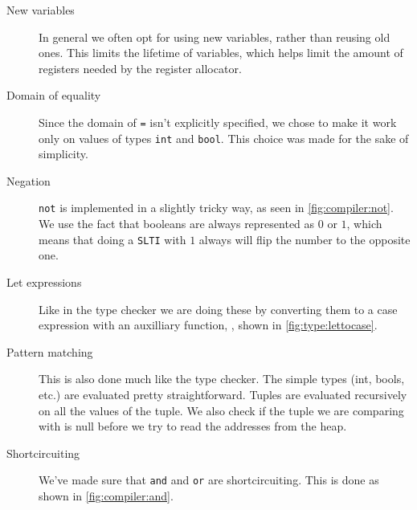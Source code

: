 \begin{description}
\item [New variables] In general we often opt for using new variables, rather
        than reusing old ones. This limits the lifetime of variables, which
        helps limit the amount of registers needed by the register allocator.

\item [Domain of equality] Since the domain of \texttt{=} isn't explicitly
        specified, we chose to make it work only on values of types
        \texttt{int} and \texttt{bool}. This choice was made for the sake of
        simplicity.

\item [Negation] \texttt{not} is implemented in a slightly tricky way, as seen
        in \autoref{fig:compiler:not}. We use the fact that booleans are always
        represented as $0$ or $1$, which means that doing a \texttt{SLTI} with
        $1$ always will flip the number to the opposite one.

\item [Let expressions] Like in the type checker we are doing these by
        converting them to a case expression with an auxilliary function,
        , shown in \autoref{fig:type:lettocase}.

\item [Pattern matching] This is also done much like the type checker. The
        simple types (int, bools, etc.) are evaluated pretty straightforward.
        Tuples are evaluated recursively on all the values of the tuple. We
        also check if the tuple we are comparing with is null before we try to
        read the addresses from the heap.

\item [Shortcircuiting] We've made sure that \texttt{and} and \texttt{or} are
        shortcircuiting. This is done as shown in \autoref{fig:compiler:and}. 
\end{description}

